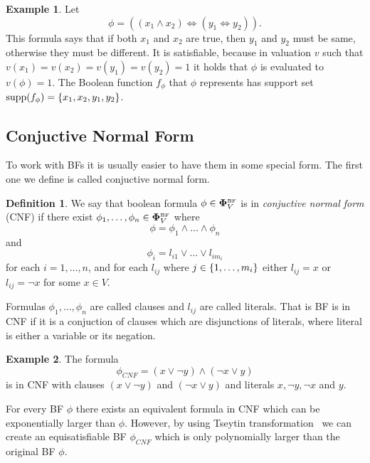 \documentclass[
  digital, %
  twoside, %
  table,   %
  nolof,     %
  nolot,     %
]{fithesis3}
\let\setbuilder\set
\newcommand{\simpleset}[1]{\{{#1}\}}
\renewcommand{\set}[1]{\normalexpandarg\IfSubStr{#1}{|}{\setbuilder{#1}}{\simpleset{#1}}}
\theoremstyle{definition}
\newtheorem{definition}{Definition}
\newtheorem{example}{Example}
\theoremstyle{remark}
\newcommand{\BF}[1]{\mathbf{\Phi}_{#1}^{\normalfont{\text{\tiny BF}}}}
\newcommand{\supp}[1]{\mathrm{supp}(#1)}
\newcommand{\lequal}{\Leftrightarrow}
\begin{document}
\begin{example}
\label{ex:BF:prenex}
Let
\[\phi = ((x_1 \land x_2) \lequal (y_1 \lequal y_2)).\]
This formula says that if both $x_1$ and $x_2$ are true, then $y_1$ and $y_2$ must be same, otherwise they must be different. It is satisfiable, because in valuation $v$ such that $v(x_1) = v(x_2) = v(y_1) = v(y_2) = 1$ it holds that $\phi$ is evaluated to $v(\phi)=1$. The Boolean function $f_{\phi}$ that $\phi$ represents has support set $\supp{f_{\phi}} = \set{x_1, x_2, y_1, y_2}$.
\end{example}

\subsection{Conjuctive Normal Form}
\label{sec:BF:CNF}
To work with BFs it is usually easier to have them in some special form. The first one we define is called conjuctive normal form.

\begin{definition}
We say that boolean formula $\phi \in \BF{V}$ is in \emph{conjuctive normal form} (CNF) if there exist $\phi_1,\dots,\phi_n \in \BF{V}$ where
\[\phi = \phi_1 \land \dots \land \phi_n\]
and
\[\phi_i = l_{i1} \lor \dots \lor l_{i{m_i}}\]
for each $i = 1, \dots, n$, and for each $l_{ij}$ where $j \in \set{1,\dots,m_i}$ either $l_{ij} = x$ or $l_{ij} = \neg x$ for some $x \in V$.
\end{definition}
Formulas $\phi_1,\dots,\phi_n$ are called clauses and $l_{ij}$ are called literals. That is BF is in CNF if it is a conjuction of clauses which are disjunctions of literals, where literal is either a variable or its negation.

\begin{example}
The formula
\[\phi_{CNF} = (x \lor \neg y) \land (\neg x \lor y)\]
is in CNF with clauses $(x \lor \neg y)$ and $(\neg x \lor y)$ and literals $x,\neg y, \neg x$ and $y$.
\end{example}

For every BF $\phi$ there exists an equivalent formula in CNF which can be exponentially larger than $\phi$. However, by using Tseytin transformation~\cite{Tseitin} we can create an equisatisfiable BF $\phi_{CNF}$ which is only polynomially larger than the original BF $\phi$.
\end{document}
